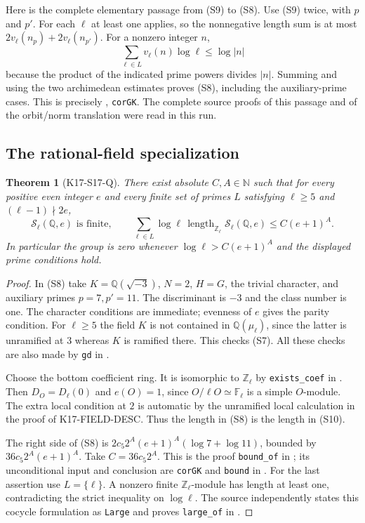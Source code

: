 \documentclass[11pt,a4paper]{article}
\newtheorem{theorem}{Theorem}[section]
\theoremstyle{definition}
\begin{document}
Here is the complete elementary passage from (S9) to (S8).
Use (S9) twice, with $p$ and $p'$. For each $\ell$ at least one applies,
so the nonnegative length sum is at most
$2v_\ell(n_p)+2v_\ell(n_{p'})$. For a nonzero integer $n$,
\[
 \sum_{\ell\in L}v_\ell(n)\log\ell\le\log|n|
\]
because the product of the indicated prime powers divides $|n|$.
Summing and using the two archimedean estimates proves (S8), including
the auxiliary-prime cases. This is precisely
, \texttt{corGK}.
The complete source proofs of this passage and of the orbit/norm
translation were read in this run.

\subsection{The rational-field specialization}

\begin{theorem}[K17-S17-Q]
There exist absolute $C,A\in\mathbb N$ such that for every positive even
integer $e$ and every finite set of primes $L$ satisfying
$\ell\ge5$ and $(\ell-1)\nmid2e$,
\[
 \mathcal S_\ell(\mathbb Q,e)\text{ is finite},\qquad
 \sum_{\ell\in L}\log\ell\,
   \operatorname{length}_{\mathbb Z_\ell}\mathcal S_\ell(\mathbb Q,e)
 \le C(e+1)^A. \tag{S10}
\]
In particular the group is zero whenever $\log\ell>C(e+1)^A$
and the displayed prime conditions hold.
\end{theorem}
\begin{proof}
In (S8) take $K=\mathbb Q(\sqrt{-3})$, $N=2$, $H=G$, the trivial
character, and auxiliary primes $p=7,p'=11$. The discriminant is $-3$
and the class number is one. The character conditions are immediate;
evenness of $e$ gives the parity condition. For $\ell\ge5$ the field
$K$ is not contained in $\mathbb Q(\mu_\ell)$, since the latter is
unramified at $3$ whereas $K$ is ramified there. This checks (S7).
All these checks are also made by \texttt{gd} in
.

Choose the bottom coefficient ring. It is isomorphic to
$\mathbb Z_\ell$ by \texttt{exists\_coef} in
. Then $D_O=D_\ell(0)$
and $e(O)=1$, since $O/\ell O\simeq\mathbb F_\ell$ is a simple
$O$-module. The extra local condition at $2$ is automatic by the
unramified local calculation in the proof of K17-FIELD-DESC.
Thus the length in (S8) is the length in (S10).

The right side of (S8) is
$2c_5 2^A(e+1)^A(\log7+\log11)$, bounded by
$36c_5 2^A(e+1)^A$. Take $C=36c_5 2^A$.
This is the proof \texttt{bound\_of} in
; its unconditional input and conclusion
are \texttt{corGK} and \texttt{bound} in
.
For the last assertion use $L=\{\ell\}$. A nonzero finite
$\mathbb Z_\ell$-module has length at least one, contradicting
the strict inequality on $\log\ell$. The source independently states
this cocycle formulation as \texttt{Large} and proves
\texttt{large\_of} in .
\end{proof}
\end{document}
